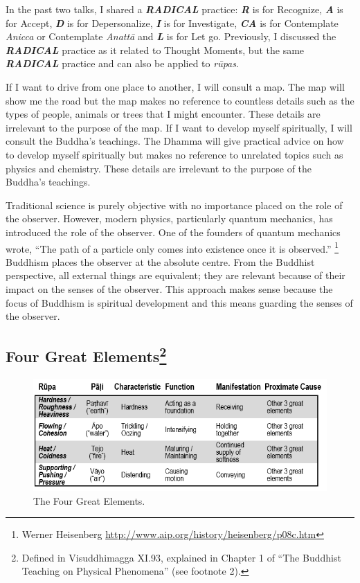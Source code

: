 In the past two talks, I shared a \textbf{\textit{RADICAL}} practice: \textbf{\textit{R}} is for Recognize, \textbf{\textit{A}} is for Accept, \textbf{\textit{D}} is for Depersonalize, \textbf{\textit{I}} is for Investigate, \textbf{\textit{CA}} is for Contemplate \textit{Anicca} or Contemplate \textit{Anattā} and \textit{\textbf{L}} is for Let go. Previously, I discussed the \textbf{\textit{RADICAL}} practice as it related to Thought Moments, but the same \textbf{\textit{RADICAL}} practice and can also be applied to \textit{rūpas}.

If I want to drive from one place to another, I will consult a map. The map will show me the road but the map makes no reference to countless details such as the types of people, animals or trees that I might encounter. These details are irrelevant to the purpose of the map. If I want to develop myself spiritually, I will consult the Buddha’s teachings. The Dhamma will give practical advice on how to develop myself spiritually but makes no reference to unrelated topics such as physics and chemistry. These details are irrelevant to the purpose of the Buddha’s teachings.

Traditional science is purely objective with no importance placed on the role of the observer. However, modern physics, particularly quantum mechanics, has introduced the role of the observer. One of the founders of quantum mechanics wrote, “The path of a particle only comes into existence once it is observed.” \footnote{Werner Heisenberg \url{http://www.aip.org/history/heisenberg/p08c.htm}} Buddhism places the observer at the absolute centre. From the Buddhist perspective, all external things are equivalent; they are relevant because of their impact on the senses of the observer. This approach makes sense because the focus of Buddhism is spiritual development and this means guarding the senses of the observer.

\subsection*{Four Great Elements\footnote{Defined in Visuddhimagga XI.93, explained in Chapter 1 of “The Buddhist Teaching on Physical Phenomena” (see footnote 2).}}

\begin{figure}[h]
\centering
\includegraphics[width=0.8\linewidth]{./Diagrams/Elements}
\caption{The Four Great Elements.}
\label{fig:Elements}
\end{figure}

